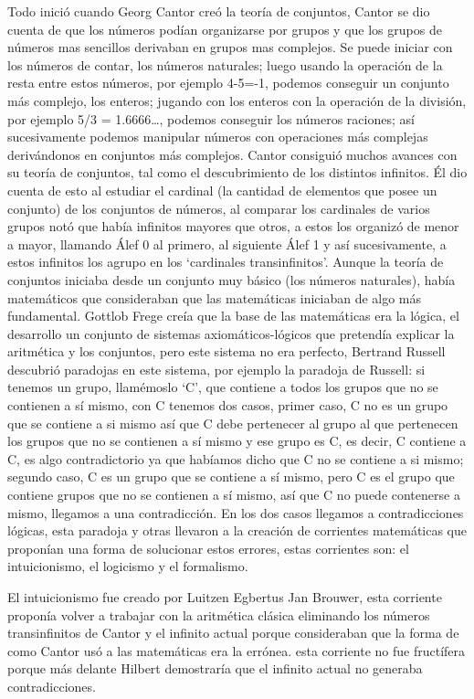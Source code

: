 \documentclass[letterpaper, 12pt]{article}
\begin{document}
Todo inició cuando Georg Cantor creó la teoría de conjuntos, Cantor se dio cuenta de que los números podían organizarse por grupos y que los grupos de números mas sencillos derivaban en grupos mas complejos. Se puede iniciar con los números de contar, los números naturales; luego usando la operación de la resta entre estos números, por ejemplo 4-5=-1, podemos conseguir un conjunto más complejo, los enteros; jugando con los enteros con la operación de la división, por ejemplo 5/3 = 1.6666…, podemos conseguir los números raciones; así sucesivamente podemos manipular números con operaciones más complejas derivándonos en conjuntos más complejos. Cantor consiguió muchos avances con su teoría de conjuntos, tal como el descubrimiento de los distintos infinitos. Él dio cuenta de esto al estudiar el cardinal (la cantidad de elementos que posee un conjunto) de los conjuntos de números, al comparar los cardinales de varios grupos notó que había infinitos mayores que otros, a estos los organizó de menor a mayor, llamando Álef 0 al primero, al siguiente Álef 1 y así sucesivamente, a estos infinitos los agrupo en los ‘cardinales transinfinitos’. Aunque la teoría de conjuntos iniciaba desde un conjunto muy básico (los números naturales), había matemáticos que consideraban que las matemáticas iniciaban de algo más fundamental. Gottlob Frege creía que la base de las matemáticas era la lógica, el desarrollo un conjunto de sistemas axiomáticos-lógicos que pretendía explicar la aritmética y los conjuntos, pero este sistema no era perfecto, Bertrand Russell descubrió paradojas en este sistema, por ejemplo la paradoja de Russell: si tenemos un grupo, llamémoslo ‘C’, que contiene a todos los grupos que no se contienen a sí mismo, con C tenemos dos casos, primer caso, C no es un grupo que se contiene a si mismo así que C debe pertenecer al grupo al que pertenecen los grupos que no se contienen a sí mismo y ese grupo es C, es decir, C contiene a C, es algo contradictorio ya que habíamos dicho que C no se contiene a si mismo; segundo caso, C es un grupo que se contiene a sí mismo, pero C es el grupo que contiene grupos que no se contienen a sí mismo, así que C no puede contenerse a mismo, llegamos a una contradicción. En los dos casos llegamos a contradicciones lógicas, esta paradoja y otras llevaron a la creación de corrientes matemáticas que proponían una forma de solucionar estos errores, estas corrientes son: el intuicionismo, el logicismo y el formalismo.

El intuicionismo fue creado por Luitzen Egbertus Jan Brouwer, esta corriente proponía volver a trabajar con la aritmética clásica eliminando los números transinfinitos de Cantor y el infinito actual porque consideraban que la forma de como Cantor usó a las matemáticas era la errónea. esta corriente no fue fructífera porque más delante Hilbert demostraría que el infinito actual no generaba contradicciones. 
\end{document}
